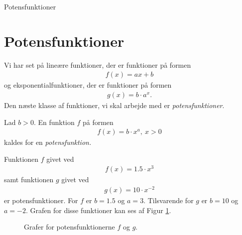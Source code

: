 \begin{center}
\Huge
Potensfunktioner
\end{center}

\section*{Potensfunktioner}

Vi har set på lineære funktioner, der er funktioner på formen
\begin{align*}
	f(x) = ax + b
\end{align*}
og eksponentialfunktioner, der er funktioner på formen
\begin{align*}
	g(x) = b\cdot a^x.
\end{align*}
Den næste klasse af funktioner, vi skal arbejde med er \textit{potensfunktioner}.
\begin{defn}[Potensfunktion]
	Lad $b > 0$. En funktion $f$ på formen
	\begin{align*}
		f(x) = b\cdot x^a, \ x > 0
	\end{align*}
	kaldes for en \textit{potensfunktion.}
\end{defn}


\begin{exa}
	Funktionen $f$ givet ved
	\begin{align*}
		f(x) = 1.5 \cdot x^3
	\end{align*}
	samt funktionen $g$ givet ved
	\begin{align*}
		g(x) = 10\cdot x^{-2}
	\end{align*}
	er potensfunktioner. For $f$ er $b = 1.5$ og $a = 3$. Tilsvarende for $g$ er $b = 10$ og $a = -2$.
	Grafen for disse funktioner kan ses af Figur \ref{fig:potensgraf}.
	
	\begin{figure}[H]
		\centering
		\caption{Grafer for potensfunktionerne $f$ og $g$.}
		\label{fig:potensgraf}
	\end{figure}
\end{exa}

